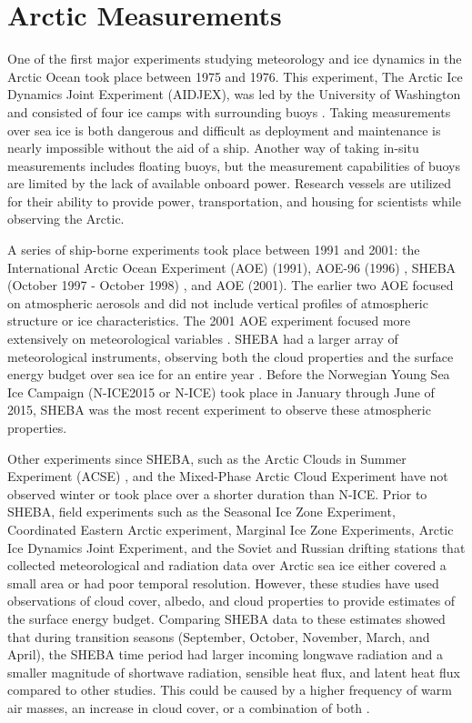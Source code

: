 \section{Arctic Measurements}
One of the first major experiments studying meteorology and ice dynamics in the Arctic Ocean took place between 1975 and 1976. This experiment, The Arctic Ice Dynamics Joint Experiment (AIDJEX), was led by the University of Washington and consisted of four ice camps with surrounding buoys \citep{untersteiner:1980}. Taking measurements over sea ice is both dangerous and difficult as deployment and maintenance is nearly impossible without the aid of a ship. Another way of taking in-situ measurements includes floating buoys, but the measurement capabilities of buoys are limited by the lack of available onboard power. Research vessels are utilized for their ability to provide power, transportation, and housing for scientists while observing the Arctic.

A series of ship-borne experiments took place between 1991 and 2001: the International Arctic Ocean Experiment (AOE) (1991), AOE-96 (1996) \citep{tjernstrom:2004}, SHEBA (October 1997 - October 1998) \citep{uttal:2002}, and AOE (2001). The earlier two AOE focused on atmospheric aerosols and did not include vertical profiles of atmospheric structure or ice characteristics. The 2001 AOE experiment focused more extensively on meteorological variables \citep{tjernstrom:2004}. SHEBA had a larger array of meteorological instruments, observing both the cloud properties and the surface energy budget over sea ice for an entire year \citep{uttal:2002}. Before the Norwegian Young Sea Ice Campaign (N-ICE2015 or N-ICE) took place in January through June of 2015, SHEBA was the most recent experiment to observe these atmospheric properties. 

Other experiments since SHEBA, such as the Arctic Clouds in Summer Experiment (ACSE) \citep{sotiropoulou:2016}, and the Mixed-Phase Arctic Cloud Experiment \citep{verlinde:2007} have not observed winter or took place over a shorter duration than N-ICE. Prior to SHEBA, field experiments such as the Seasonal Ice Zone Experiment, Coordinated Eastern Arctic experiment, Marginal Ice Zone Experiments, Arctic Ice Dynamics Joint Experiment, and the Soviet and Russian drifting stations \citep{vihma:2005, kahl:1999} that collected meteorological and radiation data over Arctic sea ice either covered a small area or had poor temporal resolution. However, these studies have used observations of cloud cover, albedo, and cloud properties to provide estimates of the surface energy budget. Comparing SHEBA data to these estimates showed that during transition seasons (September, October, November, March, and April), the SHEBA time period had larger incoming longwave radiation and a smaller magnitude of shortwave radiation, sensible heat flux, and latent heat flux compared to other studies. This could be caused by a higher frequency of warm air masses, an increase in cloud cover, or a combination of both \citep{persson:2002}. 

